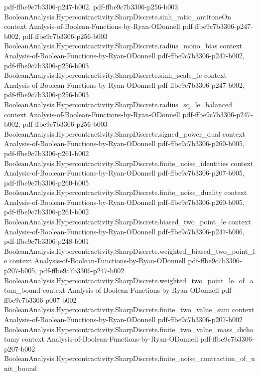 \begin{theorem}
  {pdf-ffbe9c7b3306-p247-b002,
    pdf-ffbe9c7b3306-p256-b003}
\proofstep
  {BooleanAnalysis.Hypercontractivity.SharpDiscrete.sinh_ratio_antitoneOn}
  {context}
  {Analysis-of-Boolean-Functions-by-Ryan-ODonnell}
  {pdf-ffbe9c7b3306-p247-b002,
    pdf-ffbe9c7b3306-p256-b003}
\proofstep
  {BooleanAnalysis.Hypercontractivity.SharpDiscrete.radius_mono_bias}
  {context}
  {Analysis-of-Boolean-Functions-by-Ryan-ODonnell}
  {pdf-ffbe9c7b3306-p247-b002,
    pdf-ffbe9c7b3306-p256-b003}
\proofstep
  {BooleanAnalysis.Hypercontractivity.SharpDiscrete.sinh_scale_le}
  {context}
  {Analysis-of-Boolean-Functions-by-Ryan-ODonnell}
  {pdf-ffbe9c7b3306-p247-b002,
    pdf-ffbe9c7b3306-p256-b003}
\proofstep
  {BooleanAnalysis.Hypercontractivity.SharpDiscrete.radius_sq_le_balanced}
  {context}
  {Analysis-of-Boolean-Functions-by-Ryan-ODonnell}
  {pdf-ffbe9c7b3306-p247-b002,
    pdf-ffbe9c7b3306-p256-b003}
\proofstep
  {BooleanAnalysis.Hypercontractivity.SharpDiscrete.signed_power_dual}
  {context}
  {Analysis-of-Boolean-Functions-by-Ryan-ODonnell}
  {pdf-ffbe9c7b3306-p260-b005,
    pdf-ffbe9c7b3306-p261-b002}
\proofstep
  {BooleanAnalysis.Hypercontractivity.SharpDiscrete.finite_noise_identities}
  {context}
  {Analysis-of-Boolean-Functions-by-Ryan-ODonnell}
  {pdf-ffbe9c7b3306-p207-b005,
    pdf-ffbe9c7b3306-p260-b005}
\proofstep
  {BooleanAnalysis.Hypercontractivity.SharpDiscrete.finite_noise_duality}
  {context}
  {Analysis-of-Boolean-Functions-by-Ryan-ODonnell}
  {pdf-ffbe9c7b3306-p260-b005,
    pdf-ffbe9c7b3306-p261-b002}
\proofstep
  {BooleanAnalysis.Hypercontractivity.SharpDiscrete.biased_two_point_le}
  {context}
  {Analysis-of-Boolean-Functions-by-Ryan-ODonnell}
  {pdf-ffbe9c7b3306-p247-b006,
    pdf-ffbe9c7b3306-p248-b001}
\proofstep
  {BooleanAnalysis.Hypercontractivity.SharpDiscrete.weighted_biased_two_point_le}
  {context}
  {Analysis-of-Boolean-Functions-by-Ryan-ODonnell}
  {pdf-ffbe9c7b3306-p207-b005,
    pdf-ffbe9c7b3306-p247-b002}
\proofstep
  {BooleanAnalysis.Hypercontractivity.SharpDiscrete.weighted_two_point_le_of_atom_bound}
  {context}
  {Analysis-of-Boolean-Functions-by-Ryan-ODonnell}
  {pdf-ffbe9c7b3306-p007-b002}
\proofstep
  {BooleanAnalysis.Hypercontractivity.SharpDiscrete.finite_two_value_sum}
  {context}
  {Analysis-of-Boolean-Functions-by-Ryan-ODonnell}
  {pdf-ffbe9c7b3306-p207-b002}
\proofstep
  {BooleanAnalysis.Hypercontractivity.SharpDiscrete.finite_two_value_mass_dichotomy}
  {context}
  {Analysis-of-Boolean-Functions-by-Ryan-ODonnell}
  {pdf-ffbe9c7b3306-p207-b002}
\proofstep
  {BooleanAnalysis.Hypercontractivity.SharpDiscrete.finite_noise_contraction_of_unit_bound}

\end{theorem}
